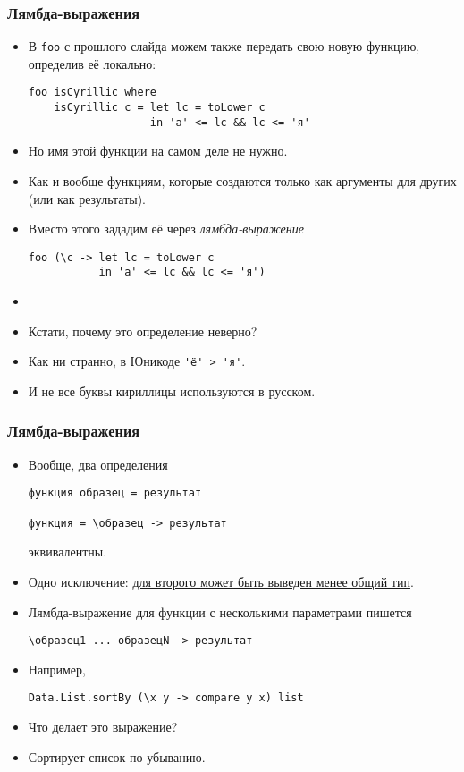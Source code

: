 \documentclass[10pt]{beamer}
\begin{document}
\begin{frame}[fragile]
\frametitle{Лямбда-выражения}
\begin{itemize}
    \item В \lstinline|foo| с прошлого слайда можем также передать свою новую функцию, определив её локально:
\begin{lstlisting}
foo isCyrillic where 
    isCyrillic c = let lc = toLower c
                   in 'а' <= lc && lc <= 'я'
\end{lstlisting}\pause
    \item Но имя этой функции на самом деле не нужно.
    \item Как и вообще функциям, которые создаются только как аргументы для других (или как результаты).\pause
    \item Вместо этого зададим её через \emph{лямбда-выражение}
\begin{lstlisting}
foo (\c -> let lc = toLower c 
           in 'а' <= lc && lc <= 'я')
\end{lstlisting}
    \pause
    \item[]
    \item Кстати, почему это определение неверно?
    \pause
    \item Как ни странно, в Юникоде \lstinline|'ё' > 'я'|.
    \item И не все буквы кириллицы используются в русском.
\end{itemize}
\end{frame}

\begin{frame}[fragile]
\frametitle{Лямбда-выражения}
\begin{itemize}
    \item Вообще, два определения
\begin{lstlisting}
функция образец = результат

функция = \образец -> результат
\end{lstlisting}
    эквивалентны.\pause
    \item Одно исключение: \href{https://wiki.haskell.org/Monomorphism_restriction}{для второго может быть выведен менее общий тип}.\pause
    \item Лямбда-выражение для функции с несколькими параметрами пишется
\begin{lstlisting}
\образец1 ... образецN -> результат
\end{lstlisting}\pause
    \item Например, 
\begin{lstlisting}
Data.List.sortBy (\x y -> compare y x) list
\end{lstlisting}
    \item Что делает это выражение?\pause
    \item Сортирует список по убыванию.
\end{itemize}
\end{frame}
\end{document}
